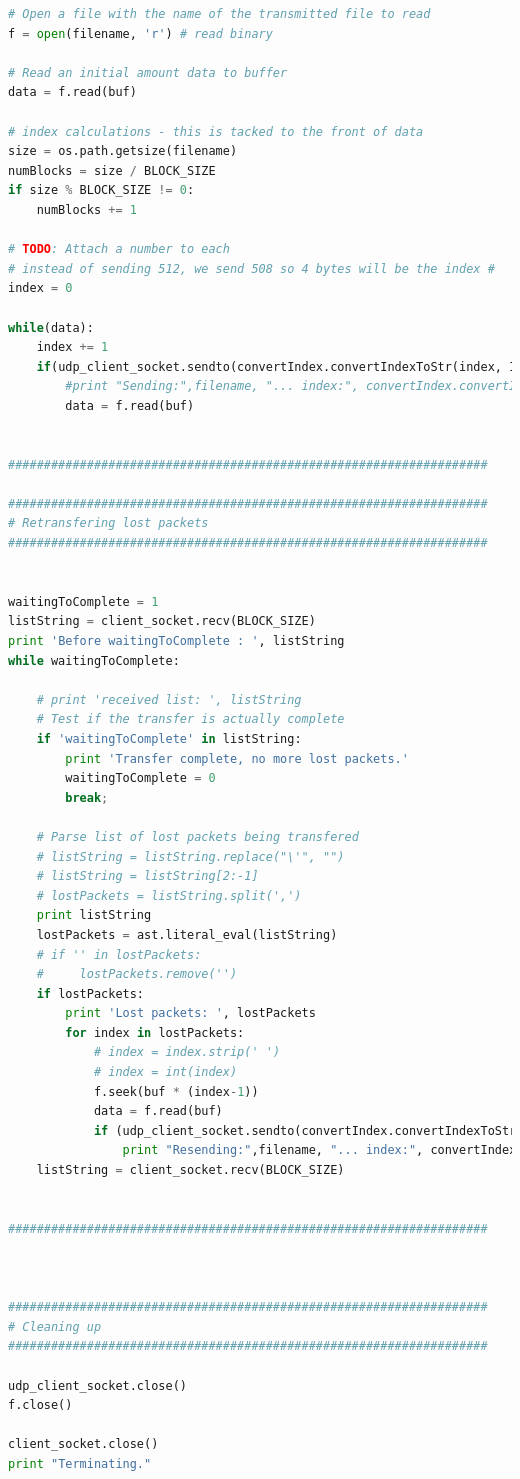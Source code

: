 \documentclass[10pt]{article}
\begin{document}
\begin{lstlisting}[language=Python]
# Open a file with the name of the transmitted file to read
f = open(filename, 'r') # read binary

# Read an initial amount data to buffer
data = f.read(buf)

# index calculations - this is tacked to the front of data
size = os.path.getsize(filename)
numBlocks = size / BLOCK_SIZE
if size % BLOCK_SIZE != 0:
    numBlocks += 1

# TODO: Attach a number to each
# instead of sending 512, we send 508 so 4 bytes will be the index #
index = 0

while(data):
    index += 1
    if(udp_client_socket.sendto(convertIndex.convertIndexToStr(index, INDEX_SIZE) + data,address)):
        #print "Sending:",filename, "... index:", convertIndex.convertIndexToStr(index, INDEX_SIZE)
        data = f.read(buf)


###################################################################

###################################################################
# Retransfering lost packets
###################################################################


waitingToComplete = 1
listString = client_socket.recv(BLOCK_SIZE)
print 'Before waitingToComplete : ', listString
while waitingToComplete:

    # print 'received list: ', listString
    # Test if the transfer is actually complete
    if 'waitingToComplete' in listString:
        print 'Transfer complete, no more lost packets.'
        waitingToComplete = 0
        break;

    # Parse list of lost packets being transfered
    # listString = listString.replace("\'", "")
    # listString = listString[2:-1]
    # lostPackets = listString.split(',')
    print listString
    lostPackets = ast.literal_eval(listString)
    # if '' in lostPackets:
    #     lostPackets.remove('')
    if lostPackets:
        print 'Lost packets: ', lostPackets
        for index in lostPackets:
            # index = index.strip(' ')
            # index = int(index)
            f.seek(buf * (index-1))
            data = f.read(buf)
            if (udp_client_socket.sendto(convertIndex.convertIndexToStr(index, INDEX_SIZE) + data,address)):
                print "Resending:",filename, "... index:", convertIndex.convertIndexToStr(index, INDEX_SIZE)
    listString = client_socket.recv(BLOCK_SIZE)


###################################################################



###################################################################
# Cleaning up
###################################################################

udp_client_socket.close()
f.close()

client_socket.close()
print "Terminating."
\end{lstlisting}
\end{document}
